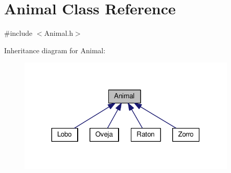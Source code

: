 \hypertarget{classAnimal}{}\section{Animal Class Reference}
\label{classAnimal}


{\ttfamily \#include $<$Animal.\+h$>$}



Inheritance diagram for Animal\+:
\nopagebreak
\begin{figure}[H]
\begin{center}
\leavevmode
\includegraphics[width=297pt]{classAnimal__inherit__graph}
\end{center}
\end{figure}
